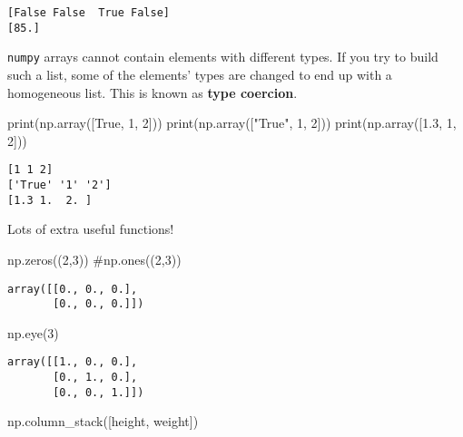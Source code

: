 \documentclass[
  letterpaper,
  DIV=11,
  numbers=noendperiod]{scrreprt}
\newenvironment{Shaded}{\begin{snugshade}}{\end{snugshade}}
\newcommand{\BuiltInTok}[1]{\textcolor[rgb]{0.00,0.23,0.31}{#1}}
\newcommand{\CommentTok}[1]{\textcolor[rgb]{0.37,0.37,0.37}{#1}}
\newcommand{\DecValTok}[1]{\textcolor[rgb]{0.68,0.00,0.00}{#1}}
\newcommand{\FloatTok}[1]{\textcolor[rgb]{0.68,0.00,0.00}{#1}}
\newcommand{\NormalTok}[1]{\textcolor[rgb]{0.00,0.23,0.31}{#1}}
\newcommand{\StringTok}[1]{\textcolor[rgb]{0.13,0.47,0.30}{#1}}
\newcommand{\VariableTok}[1]{\textcolor[rgb]{0.07,0.07,0.07}{#1}}
\begin{document}
\begin{verbatim}
[False False  True False]
[85.]
\end{verbatim}

\texttt{numpy} arrays cannot contain elements with different types. If
you try to build such a list, some of the elements' types are changed to
end up with a homogeneous list. This is known as \textbf{type coercion}.

\begin{Shaded}
\begin{Highlighting}[]
\BuiltInTok{print}\NormalTok{(np.array([}\VariableTok{True}\NormalTok{, }\DecValTok{1}\NormalTok{, }\DecValTok{2}\NormalTok{]))}
\BuiltInTok{print}\NormalTok{(np.array([}\StringTok{"True"}\NormalTok{, }\DecValTok{1}\NormalTok{, }\DecValTok{2}\NormalTok{]))}
\BuiltInTok{print}\NormalTok{(np.array([}\FloatTok{1.3}\NormalTok{, }\DecValTok{1}\NormalTok{, }\DecValTok{2}\NormalTok{]))}
\end{Highlighting}
\end{Shaded}

\begin{verbatim}
[1 1 2]
['True' '1' '2']
[1.3 1.  2. ]
\end{verbatim}

Lots of extra useful functions!

\begin{Shaded}
\begin{Highlighting}[]
\NormalTok{np.zeros((}\DecValTok{2}\NormalTok{,}\DecValTok{3}\NormalTok{))}
\CommentTok{\#np.ones((2,3))}
\end{Highlighting}
\end{Shaded}

\begin{verbatim}
array([[0., 0., 0.],
       [0., 0., 0.]])
\end{verbatim}

\begin{Shaded}
\begin{Highlighting}[]
\NormalTok{np.eye(}\DecValTok{3}\NormalTok{)}
\end{Highlighting}
\end{Shaded}

\begin{verbatim}
array([[1., 0., 0.],
       [0., 1., 0.],
       [0., 0., 1.]])
\end{verbatim}

\begin{Shaded}
\begin{Highlighting}[]
\NormalTok{np.column\_stack([height, weight])}
\end{Highlighting}
\end{Shaded}
\end{document}
